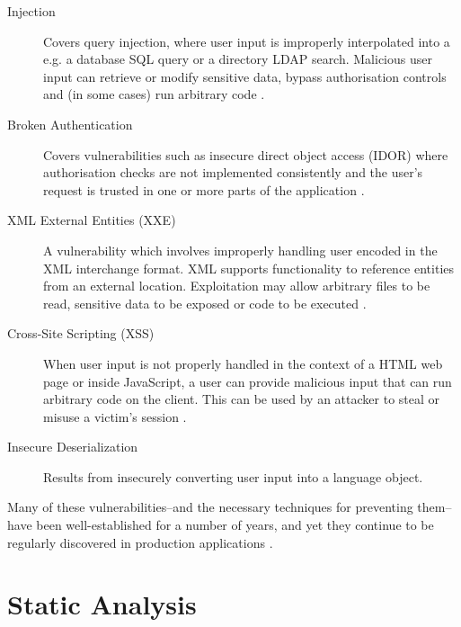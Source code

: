 \documentclass[a4paper,openany,12pt]{book}
\begin{document}
\begin{description}
	\item[Injection] Covers query injection, where user input is improperly interpolated into a e.g. a database SQL query or a directory LDAP search. Malicious user input can retrieve or modify sensitive data, bypass authorisation controls and (in some cases) run arbitrary code \citep[p.~291]{stuttard2011web}.
	\item[Broken Authentication] Covers vulnerabilities such as insecure direct object access (IDOR) where authorisation checks are not implemented consistently and the user's request is trusted in one or more parts of the application \citep[p.~257]{stuttard2011web}.
	\item[XML External Entities (XXE)] A vulnerability which involves improperly handling user encoded in the XML interchange format. XML supports functionality to reference entities from an external location. Exploitation may allow arbitrary files to be read, sensitive data to be exposed or code to be executed  \citep[p.~384]{stuttard2011web}.
	\item[Cross-Site Scripting (XSS)] When user input is not properly handled in the context of a HTML web page or inside JavaScript, a user can provide malicious input that can run arbitrary code on the client. This can be used by an attacker to steal or misuse a victim's session \citep[p.~431]{stuttard2011web}.
	\item[Insecure Deserialization] Results from insecurely converting user input into a language object.
\end{description}

Many of these vulnerabilities--and the necessary techniques for preventing them--have been well-established for a number of years, and yet they continue to be regularly discovered in production applications \citep[p.~2]{schneier2011secrets}.

\section{Static Analysis}
\end{document}
